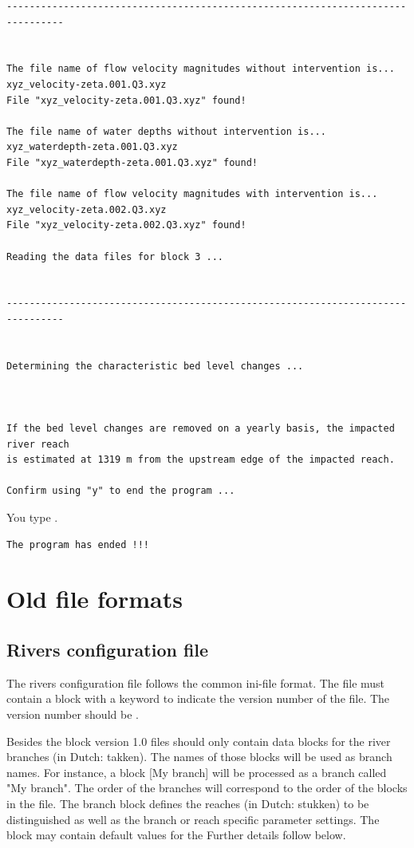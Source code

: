 \begin{Verbatim}
--------------------------------------------------------------------------------


The file name of flow velocity magnitudes without intervention is...
xyz_velocity-zeta.001.Q3.xyz
File "xyz_velocity-zeta.001.Q3.xyz" found!

The file name of water depths without intervention is...
xyz_waterdepth-zeta.001.Q3.xyz
File "xyz_waterdepth-zeta.001.Q3.xyz" found!

The file name of flow velocity magnitudes with intervention is...
xyz_velocity-zeta.002.Q3.xyz
File "xyz_velocity-zeta.002.Q3.xyz" found!

Reading the data files for block 3 ...


--------------------------------------------------------------------------------


Determining the characteristic bed level changes ...



If the bed level changes are removed on a yearly basis, the impacted river reach
is estimated at 1319 m from the upstream edge of the impacted reach.

Confirm using "y" to end the program ...
\end{Verbatim}

You type .

\begin{Verbatim}
The program has ended !!!
\end{Verbatim}

\section{Old file formats}\label{app-v1:old-formats}

\subsection{Rivers configuration file}\label{app-v1:rivers}

The rivers configuration file follows the common ini-file format.
The file must contain a \keyw{[General]} block with a keyword  to indicate the version number of the file.
The version number should be .

Besides the \keyw{[General]} block version 1.0 files should only contain data blocks for the river branches (in Dutch: takken).
The names of those blocks will be used as branch names.
For instance, a block [My branch] will be processed as a branch called "My branch".
The order of the branches will correspond to the order of the blocks in the file.
The branch block defines the reaches (in Dutch: stukken) to be distinguished as well as the branch or reach specific parameter settings.
The \keyw{[General]} block may contain default values for the 
Further details follow below.

